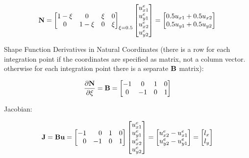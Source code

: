 \begin{equation}
    \mathbf{N} = \begin{bmatrix}
        1 - \xi & 0 & \xi & 0 \\
        0 & 1 - \xi & 0 & \xi \\
    \end{bmatrix}_{\xi = 0.5}
    \begin{bmatrix}
        u_{x1}^e \\
        u_{y1}^e \\
        u_{x2}^e \\
        u_{y2}^e \\
    \end{bmatrix}
    = \begin{bmatrix}
        0.5 u_{x1} + 0.5 u_{x2} \\
        0.5 u_{y1} + 0.5 u_{y2} \\
    \end{bmatrix}
\end{equation}

Shape Function Derivatives in Natural Coordinates (there is a row for each
integration point if the coordinates are specified as matrix, not a column
vector. otherwise for each integration point there is a separate $ \mathbf{B} $
matrix):

\begin{equation}
    \frac{\partial \mathbf{N}}{\partial \xi} =
    \mathbf{B} = \begin{bmatrix}
        -1 & 0 & 1 & 0 \\
        0 & -1 & 0 & 1 \\
    \end{bmatrix}
\end{equation}

Jacobian:

\begin{equation}
    \mathbf{J} = \mathbf{B} \mathbf{u} =
    \begin{bmatrix}
        -1 & \phantom{-}0 & 1 & 0 \\
        \phantom{-}0 & -1 & 0 & 1  \\
    \end{bmatrix}
    \begin{bmatrix}
        u_{x1}^e \\
        u_{y1}^e \\
        u_{x2}^e \\
        u_{y2}^e \\
    \end{bmatrix}
    = \begin{bmatrix}
        u_{x2}^e - u_{x1}^e \\
        u_{y2}^e - u_{y1}^e \\
    \end{bmatrix}
    = \begin{bmatrix}
        l_x \\
        l_y \\
    \end{bmatrix}
\end{equation}

